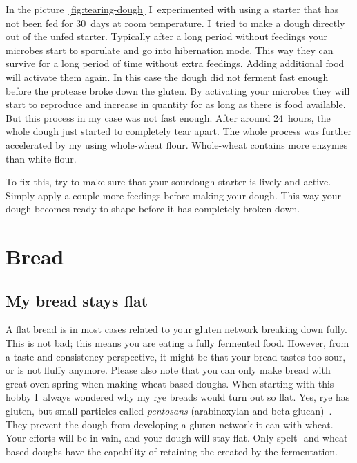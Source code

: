 In the picture~\ref{fig:tearing-dough} I~experimented with
using a starter that has not been fed for 30~days at room temperature.
I~tried to make a dough directly out of the unfed starter.
Typically after a long period
without feedings your microbes start to sporulate and go
into hibernation mode. This way they can survive for a long
period of time without extra feedings. Adding additional food
will activate them again. In this case the dough did not ferment
fast enough before the protease broke down the gluten. By activating
your microbes they will start to reproduce and increase in quantity
for as long as there is food available. But this process
in my case was not fast enough. After around 24~hours, the whole
dough just started to completely tear apart. The whole process was further
accelerated by my using whole-wheat flour. Whole-wheat
contains more enzymes than white flour.

To fix this, try to make sure that your sourdough starter is lively
and active. Simply apply a couple more feedings before
making your dough. This way your dough becomes ready to shape
before it has completely broken down.

\section{Bread}
\subsection{My bread stays flat}

A flat bread is in most cases related to your gluten
network breaking down fully. This is not bad; this
means you are eating a fully fermented food. However,
from a taste and consistency perspective, it might be
that your bread tastes too sour, or is not fluffy anymore.
Please also note that you can only make bread with
great oven spring when making wheat based doughs. When
starting with this hobby I~always wondered why my rye
breads would turn out so flat. Yes, rye has gluten, but
small particles called \emph{pentosans} (arabinoxylan and beta-glucan)~\cite{rye-defects}.
They prevent the dough from developing a gluten network it can
with wheat. Your efforts will be in vain, and your dough will
stay flat. Only spelt- and wheat-based doughs have the capability
of retaining the  created by the fermentation.

